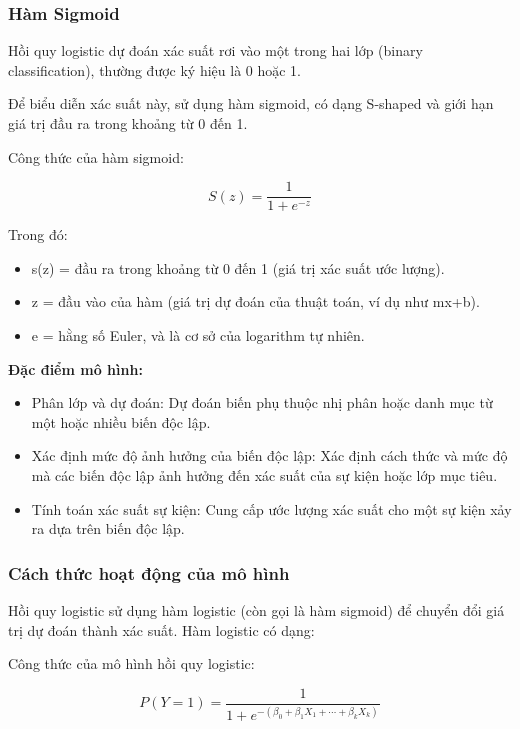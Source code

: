 \documentclass[
]{article}
\begin{document}
\subsubsection{Hàm Sigmoid}\label{huxe0m-sigmoid}

Hồi quy logistic dự đoán xác suất rơi vào một trong hai lớp (binary
classification), thường được ký hiệu là 0 hoặc 1.

Để biểu diễn xác suất này, sử dụng hàm sigmoid, có dạng S-shaped và giới
hạn giá trị đầu ra trong khoảng từ 0 đến 1.

Công thức của hàm sigmoid:

\[
S(z) = \frac{1}{1 + e^{-z}}
\]

Trong đó:

\begin{itemize}
\item
  s(z) = đầu ra trong khoảng từ 0 đến 1 (giá trị xác suất ước lượng).
\item
  z = đầu vào của hàm (giá trị dự đoán của thuật toán, ví dụ như mx+b).
\item
  e = hằng số Euler, và là cơ sở của logarithm tự nhiên.
\end{itemize}

\textbf{Đặc điểm mô hình:}

\begin{itemize}
\item
  Phân lớp và dự đoán: Dự đoán biến phụ thuộc nhị phân hoặc danh mục từ
  một hoặc nhiều biến độc lập.
\item
  Xác định mức độ ảnh hưởng của biến độc lập: Xác định cách thức và mức
  độ mà các biến độc lập ảnh hưởng đến xác suất của sự kiện hoặc lớp mục
  tiêu.
\item
  Tính toán xác suất sự kiện: Cung cấp ước lượng xác suất cho một sự
  kiện xảy ra dựa trên biến độc lập.
\end{itemize}

\subsubsection{Cách thức hoạt động của mô
hình}\label{cuxe1ch-thux1ee9c-houx1ea1t-ux111ux1ed9ng-cux1ee7a-muxf4-huxecnh}

Hồi quy logistic sử dụng hàm logistic (còn gọi là hàm sigmoid) để chuyển
đổi giá trị dự đoán thành xác suất. Hàm logistic có dạng:

Công thức của mô hình hồi quy logistic:

\[
P(Y = 1) = \frac{1}{1 + e^{-(\beta_0 + \beta_1 X_1 + \cdots + \beta_k X_k)}}
\]
\end{document}
